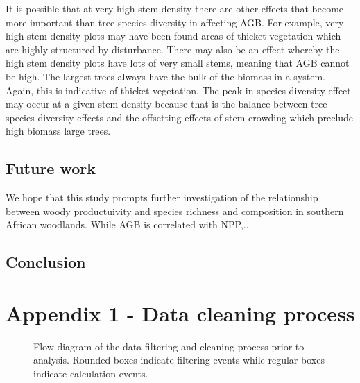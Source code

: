 \documentclass[11pt,a4paper]{article}
\begin{document}
It is possible that at very high stem density there are other effects that become more important than tree species diversity in affecting AGB. For example, very high stem density plots may have been found areas of thicket vegetation which are highly structured by disturbance. There may also be an effect whereby the high stem density plots have lots of very small stems, meaning that AGB cannot be high. The largest trees always have the bulk of the biomass in a system. Again, this is indicative of thicket vegetation. The peak in species diversity effect may occur at a given stem density because that is the balance between tree species diversity effects and the offsetting effects of stem crowding which preclude high biomass large trees.




\subsection{Future work}

We hope that this study prompts further investigation of the relationship between woody productuivity and species richness and composition in southern African woodlands. While AGB is correlated with NPP,...

\subsection{Conclusion}



\newpage{}
\appendix{}

\section*{Appendix 1 - Data cleaning process}

\begin{figure}[H]
\centering
	
	\caption{Flow diagram of the data filtering and cleaning process prior to analysis. Rounded boxes indicate filtering events while regular boxes indicate calculation events.}
	\label{data_clean_flow}
\end{figure}
\end{document}
